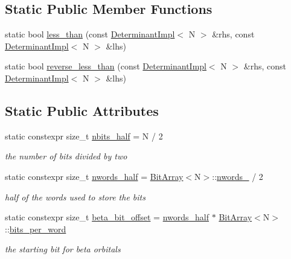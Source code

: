 \subsection*{Static Public Member Functions}
\begin{DoxyCompactItemize}
\item 
static bool \mbox{\hyperlink{classforte_1_1_determinant_impl_afa56e1f10e5d64c959ff0257a9ee8eb0}{less\+\_\+than}} (const \mbox{\hyperlink{classforte_1_1_determinant_impl}{Determinant\+Impl}}$<$ N $>$ \&rhs, const \mbox{\hyperlink{classforte_1_1_determinant_impl}{Determinant\+Impl}}$<$ N $>$ \&lhs)
\item 
static bool \mbox{\hyperlink{classforte_1_1_determinant_impl_a082c139fb3b70315591512bb4d36857f}{reverse\+\_\+less\+\_\+than}} (const \mbox{\hyperlink{classforte_1_1_determinant_impl}{Determinant\+Impl}}$<$ N $>$ \&rhs, const \mbox{\hyperlink{classforte_1_1_determinant_impl}{Determinant\+Impl}}$<$ N $>$ \&lhs)
\end{DoxyCompactItemize}
\subsection*{Static Public Attributes}
\begin{DoxyCompactItemize}
\item 
static constexpr size\+\_\+t \mbox{\hyperlink{classforte_1_1_determinant_impl_ac8d2a64c2fb785ccb79b1cecc553d63d}{nbits\+\_\+half}} = N / 2
\begin{DoxyCompactList}\small\item\em the number of bits divided by two \end{DoxyCompactList}\item 
static constexpr size\+\_\+t \mbox{\hyperlink{classforte_1_1_determinant_impl_a7474c95c308be22daaa9cd26aed8a035}{nwords\+\_\+half}} = \mbox{\hyperlink{classforte_1_1_bit_array}{Bit\+Array}}$<$N$>$\+::\mbox{\hyperlink{classforte_1_1_bit_array_aeaa8016f00f9ffc5822081f7e45656e8}{nwords\+\_\+}} / 2
\begin{DoxyCompactList}\small\item\em half of the words used to store the bits \end{DoxyCompactList}\item 
static constexpr size\+\_\+t \mbox{\hyperlink{classforte_1_1_determinant_impl_aae5a6637a75d4c47513e906c60857f2b}{beta\+\_\+bit\+\_\+offset}} = \mbox{\hyperlink{classforte_1_1_determinant_impl_a7474c95c308be22daaa9cd26aed8a035}{nwords\+\_\+half}} $\ast$ \mbox{\hyperlink{classforte_1_1_bit_array}{Bit\+Array}}$<$N$>$\+::\mbox{\hyperlink{classforte_1_1_bit_array_ad5ca62ac879b44e0e28017a73fd6c3fd}{bits\+\_\+per\+\_\+word}}
\begin{DoxyCompactList}\small\item\em the starting bit for beta orbitals \end{DoxyCompactList}\end{DoxyCompactItemize}
